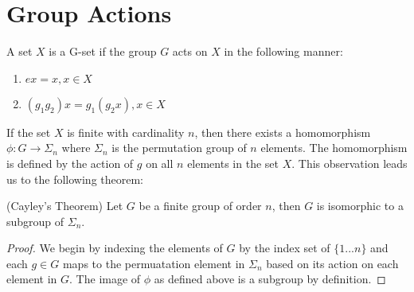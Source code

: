 \documentclass[main.tex]{subfiles}
\begin{document}
\section{Group Actions}

\begin{definition}
A set $X$ is a G-set if the group $G$ acts on $X$ in the following manner:
\begin{enumerate}
\item $ex = x, x \in X$
\item $(g_1g_2)x = g_1(g_2x), x \in X$
\end{enumerate}
\end{definition}

If the set $X$ is finite with cardinality $n$, then there exists a homomorphism $\phi: G \rightarrow \Sigma_n$
where $\Sigma_n$ is the permutation group of $n$ elements. The homomorphism is defined by the action of $g$ on all $n$ elements in the set $X$. This observation leads us to the following theorem:

\begin{theorem} 
(Cayley's Theorem)
Let $G$ be a finite group of order $n$, then $G$ is isomorphic to a subgroup of $\Sigma_n$.
\end{theorem}

\begin{proof}
We begin by indexing the elements of $G$ by the index set of $\{1...n\}$ and each $g \in G$ maps to the permuatation element in $\Sigma_n$ based on its action on each element in $G$. The image of $\phi$ as defined above is a subgroup by definition. 
\end{proof}
\end{document}
